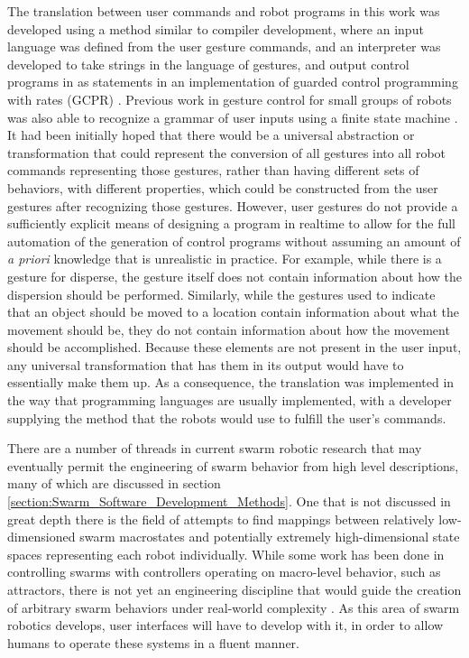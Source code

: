 The translation between user commands and robot programs in this work was developed using a method similar to compiler development, where an input language was defined from the user gesture commands, and an interpreter was developed to take strings in the language of gestures, and output control programs in as statements in an implementation of guarded control programming with rates (GCPR) \citep{napp2011compositional}.  
Previous work in gesture control for small groups of robots was also able to recognize a grammar of user inputs using a finite state machine \citep{micire2010multi}.
It had been initially hoped that there would be a universal abstraction or transformation that could represent the conversion of all gestures into all robot commands representing those gestures, rather than having different sets of behaviors, with different properties, which could be constructed from the user gestures after recognizing those gestures. 
However, user gestures do not provide a sufficiently explicit means of designing a program in realtime to allow for the full automation of the generation of control programs without assuming an amount of \emph{a priori} knowledge that is unrealistic in practice. 
For example, while there is a gesture for disperse, the gesture itself does not contain information about how the dispersion should be performed. 
Similarly, while the gestures used to indicate that an object should be moved to a location contain information about what the movement should be, they do not contain information about how the movement should be accomplished. 
Because these elements are not present in the user input, any universal transformation that has them in its output would have to essentially make them up. 
As a consequence, the translation was implemented in the way that programming languages are usually implemented, with a developer supplying the method that the robots would use to fulfill the user's commands. 

There are a number of threads in current swarm robotic research that may eventually permit the engineering of swarm behavior from high level descriptions, many of which are discussed in section \ref{section:Swarm_Software_Development_Methods}. 
One that is not discussed in great depth there is the field of attempts to find mappings between relatively low-dimensioned swarm macrostates and potentially extremely high-dimensional state spaces representing each robot individually. 
While some work has been done in controlling swarms with controllers operating on macro-level behavior, such as attractors, there is not yet an engineering discipline that would guide the creation of arbitrary swarm behaviors under real-world complexity \citep{brown2014human}. 
As this area of swarm robotics develops, user interfaces will have to develop with it, in order to allow humans to operate these systems in a fluent manner. 